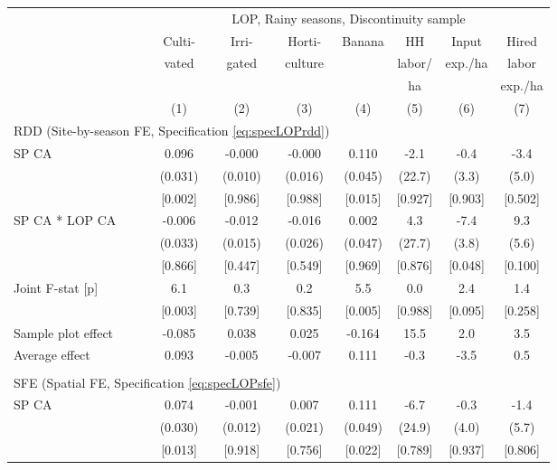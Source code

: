 \begin{tabular}{lccccccc}
\hline \hline
 & \multicolumn{7}{c}{LOP, Rainy seasons, Discontinuity sample} \\
\cmidrule(lr){2-8}
 & Culti- & Irri- & Horti- & Banana & HH & Input & Hired \\
 & vated & gated & culture & & labor/ & exp./ha & labor \\
 & & & & & ha & & exp./ha \\
\cmidrule(lr){2-2}\cmidrule(lr){3-3}\cmidrule(lr){4-4}\cmidrule(lr){5-5}\cmidrule(lr){6-6}\cmidrule(lr){7-7}\cmidrule(lr){8-8}
 & (1) & (2) & (3) & (4) & (5) & (6) & (7) \\
\hline
\multicolumn{4}{l}{RDD (Site-by-season FE, Specification \ref{eq:specLOPrdd})} & & & & \\
\cmidrule(lr){1-4}
SP CA & 0.096 & -0.000\hphantom{-} & -0.000\hphantom{-} & 0.110 & -2.1\hphantom{-} & -0.4\hphantom{-} & -3.4\hphantom{-} \\
 & (0.031) & (0.010) & (0.016) & (0.045) & (22.7) & (3.3) & (5.0) \\
 & [0.002] & [0.986] & [0.988] & [0.015] & [0.927] & [0.903] & [0.502] \\
SP CA * LOP CA & -0.006\hphantom{-} & -0.012\hphantom{-} & -0.016\hphantom{-} & 0.002 & 4.3 & -7.4\hphantom{-} & 9.3 \\
 & (0.033) & (0.015) & (0.026) & (0.047) & (27.7) & (3.8) & (5.6) \\
 & [0.866] & [0.447] & [0.549] & [0.969] & [0.876] & [0.048] & [0.100] \\
Joint F-stat [p] & 6.1 & 0.3 & 0.2 & 5.5 & 0.0 & 2.4 & 1.4 \\
 & [0.003] & [0.739] & [0.835] & [0.005] & [0.988] & [0.095] & [0.258] \\
\cmidrule(lr){1-8}
Sample plot effect & -0.085 & 0.038 & 0.025 & -0.164 & 15.5 & 2.0 & 3.5 \\
Average effect & 0.093 & -0.005 & -0.007 & 0.111 & -0.3 & -3.5 & 0.5 \\
\cmidrule(lr){1-8}
\\[-0.5em]
\multicolumn{4}{l}{SFE (Spatial FE, Specification \ref{eq:specLOPsfe})} & & & & \\
\cmidrule(lr){1-4}
SP CA & 0.074 & -0.001\hphantom{-} & 0.007 & 0.111 & -6.7\hphantom{-} & -0.3\hphantom{-} & -1.4\hphantom{-} \\
 & (0.030) & (0.012) & (0.021) & (0.049) & (24.9) & (4.0) & (5.7) \\
 & [0.013] & [0.918] & [0.756] & [0.022] & [0.789] & [0.937] & [0.806] \\

\end{tabular}

